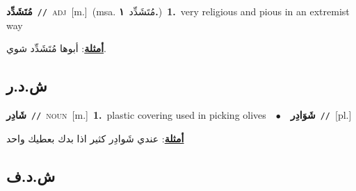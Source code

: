 \documentclass[10pt,a4paper,twoside]{article} %
\begin{document}
\begin{multicols}{2}
{\setlength\topsep{0pt}\textbf{\foreignlanguage{arabic}{مُتَشَدِّد}}\ {\color{gray}\texttt{//}\color{black}}\ \textsc{adj}\ [m.]\ \color{gray}(msa. \foreignlanguage{arabic}{مُتَشَدِّد}~\foreignlanguage{arabic}{\textbf{١.}})\color{black}\ \textbf{1.}~very religious and pious in an extremist way\  \begin{flushright}\color{gray}\foreignlanguage{arabic}{\textbf{\underline{\foreignlanguage{arabic}{أمثلة}}}: أبوها مُتَشَدِّد شوي.}\end{flushright}\color{black}} \vspace{2mm}

\vspace{-3mm}
\subsection*{\color{blue}\foreignlanguage{arabic}{ش.د.ر}\color{blue}{}} 

{\setlength\topsep{0pt}\textbf{\foreignlanguage{arabic}{شَادِر}}\ {\color{gray}\texttt{//}\color{black}}\ \textsc{noun}\ [m.]\ \textbf{1.}~plastic covering used in picking olives\ \ $\bullet$\ \ \setlength\topsep{0pt}\textbf{\foreignlanguage{arabic}{شَوَادِر}}\ {\color{gray}\texttt{//}\color{black}}\ [pl.]\  \begin{flushright}\color{gray}\foreignlanguage{arabic}{\textbf{\underline{\foreignlanguage{arabic}{أمثلة}}}: عندي شَوادِر كثير اذا بدك بعطيك واحد}\end{flushright}\color{black}} \vspace{2mm}

\vspace{-3mm}
\subsection*{\color{blue}\foreignlanguage{arabic}{ش.د.ف}\color{blue}{}} 


\end{multicols}
\end{document}
